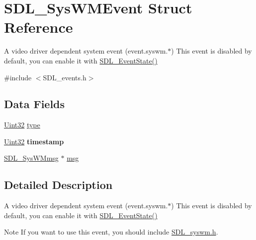 \hypertarget{struct_s_d_l___sys_w_m_event}{}\section{S\+D\+L\+\_\+\+Sys\+W\+M\+Event Struct Reference}
\label{struct_s_d_l___sys_w_m_event}


A video driver dependent system event (event.\+syswm.$\ast$) This event is disabled by default, you can enable it with \hyperlink{_s_d_l__events_8h_afb772893e1c46f186fa39a4defe76df3}{S\+D\+L\+\_\+\+Event\+State()}  




{\ttfamily \#include $<$S\+D\+L\+\_\+events.\+h$>$}

\subsection*{Data Fields}
\begin{DoxyCompactItemize}
\item 
\hyperlink{_s_d_l__stdinc_8h_add440eff171ea5f55cb00c4a9ab8672d}{Uint32} \hyperlink{struct_s_d_l___sys_w_m_event_aa40a9b05c3154032b9f2d7220e9f08dc}{type}
\item 
\hyperlink{_s_d_l__stdinc_8h_add440eff171ea5f55cb00c4a9ab8672d}{Uint32} {\bfseries timestamp}\hypertarget{struct_s_d_l___sys_w_m_event_abf1ed7edeab81db9c05d899836a44a2f}{}\label{struct_s_d_l___sys_w_m_event_abf1ed7edeab81db9c05d899836a44a2f}

\item 
\hyperlink{struct_s_d_l___sys_w_mmsg}{S\+D\+L\+\_\+\+Sys\+W\+Mmsg} $\ast$ \hyperlink{struct_s_d_l___sys_w_m_event_a7b74458e040fff2d0b02a00df56049b0}{msg}
\end{DoxyCompactItemize}


\subsection{Detailed Description}
A video driver dependent system event (event.\+syswm.$\ast$) This event is disabled by default, you can enable it with \hyperlink{_s_d_l__events_8h_afb772893e1c46f186fa39a4defe76df3}{S\+D\+L\+\_\+\+Event\+State()} 

\begin{DoxyNote}{Note}
If you want to use this event, you should include \hyperlink{_s_d_l__syswm_8h}{S\+D\+L\+\_\+syswm.\+h}. 
\end{DoxyNote}


